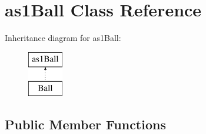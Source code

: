 \hypertarget{classas1_ball}{\section{as1\+Ball Class Reference}
\label{classas1_ball}
}
Inheritance diagram for as1\+Ball\+:\begin{figure}[H]
\begin{center}
\leavevmode
\includegraphics[height=2.000000cm]{classas1_ball}
\end{center}
\end{figure}
\subsection*{Public Member Functions}
